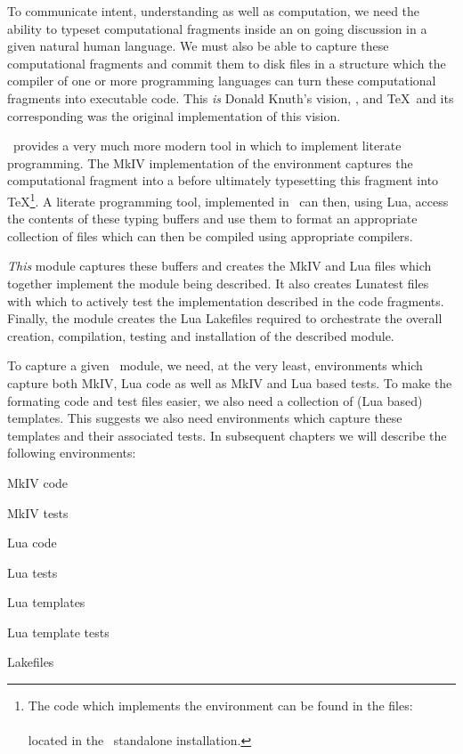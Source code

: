 To communicate intent, understanding as well as computation, we need the 
ability to typeset computational fragments inside an on going discussion 
in a given natural human language. We must also be able to capture these 
computational fragments and commit them to disk files in a structure which 
the compiler of one or more programming languages can turn these 
computational fragments into executable code. This \emph{is} Donald 
Knuth's vision, \cite{knuth1984literateProgramming}, and \TeX\ and its 
corresponding  was the original implementation of this vision. 

\ConTeXt\ provides a very much more modern tool in which to implement 
literate programming. The MkIV implementation of the  
environment captures the computational fragment into a  
before ultimately typesetting this fragment into \TeX\footnote{The code 
which implements the  environment can be found in the 
files:\\ 
\\ 
located in the \ConTeXt\ standalone installation.}. A literate programming 
tool, implemented in \ConTeXt\, can then, using Lua, access the contents 
of these typing buffers and use them to format an appropriate collection 
of files which can then be compiled using appropriate compilers. 

\emph{This}  module captures these buffers and 
creates the MkIV and Lua files which together implement the module being 
described. It also creates Lunatest files with which to actively test the 
implementation described in the code fragments. Finally, the 
 module creates the Lua Lakefiles required to 
orchestrate the overall creation, compilation, testing and installation 
of the described module. 

To capture a given \ConTeXt\ module, we need, at the very least, 
 environments which capture both MkIV, Lua code as well as 
MkIV and Lua based tests. To make the formating code and test files 
easier, we also need a collection of (Lua based) templates. This suggests 
we also need  environments which capture these templates and 
their associated tests. In subsequent chapters we will describe the 
following environments: 
%
\startitemize
\item MkIV code
\item MkIV tests
\item Lua code
\item Lua tests
\item Lua templates
\item Lua template tests
\item Lakefiles
\stopitemize

\stopchapter 

